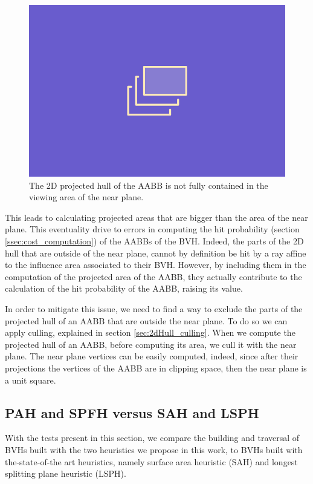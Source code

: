 \documentclass{PoliMi_MasterThesis}
\begin{document}
\begin{figure}[H]
	\includegraphics[width=\textwidth]{Images/TODO.png}
	\caption{The 2D projected hull of the AABB is not fully contained in the viewing area of the near plane.}
	\label{fig:projection_outside_near_plane}
\end{figure}

This leads to calculating projected areas that are bigger than the area of the near plane. This eventuality drive to errors in computing the hit probability (section \ref{ssec:cost_computation}) of the AABBs of the BVH. Indeed, the parts of the 2D hull that are outside of the near plane, cannot by definition be hit by a ray affine to the influence area associated to their BVH. However, by including them in the computation of the projected area of the AABB, they actually contribute to the calculation of the hit probability of the AABB, raising its value.

In order to mitigate this issue, we need to find a way to exclude the parts of the projected hull of an AABB that are outside the near plane. To do so we can apply culling, explained in section \ref{sec:2dHull_culling}. When we compute the projected hull of an AABB, before computing its area, we cull it with the near plane. The near plane vertices can be easily computed, indeed, since after their projections the vertices of the AABB are in clipping space, then the near plane is a unit square.

\subsection{PAH and SPFH versus SAH and LSPH} \label{ssec:pah_spfh_vs_sah_lsph}
With the tests present in this section, we compare the building and traversal of BVHs built with the two heuristics we propose in this work, to BVHs built with the-state-of-the art heuristics, namely surface area heuristic (SAH) and longest splitting plane heuristic (LSPH). 
\end{document}
